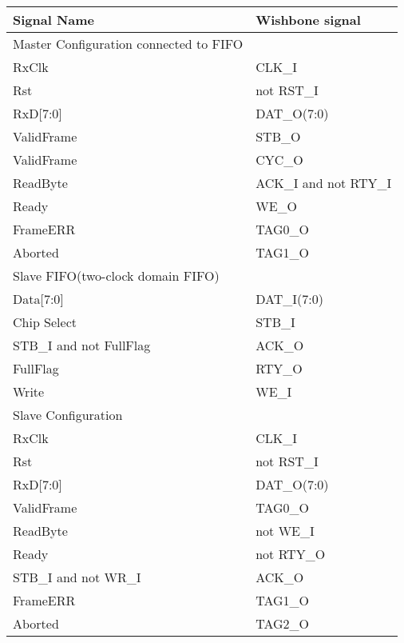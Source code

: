 \documentclass[a4paper,11pt]{article}
\begin{document}
\begin{tabular}{|l|l|}
\hline
Signal Name& Wishbone signal\\
\hline
\hline
Master Configuration connected to FIFO&\\
\hline
RxClk & CLK\_I\\
Rst & not RST\_I\\
RxD[7:0]& DAT\_O(7:0)\\
ValidFrame& STB\_O\\
ValidFrame& CYC\_O\\
ReadByte& ACK\_I and not RTY\_I\\
Ready& WE\_O\\
FrameERR& TAG0\_O\\
Aborted& TAG1\_O\\
\hline
Slave FIFO(two-clock domain FIFO)&\\
\hline
Data[7:0]& DAT\_I(7:0)\\
Chip Select& STB\_I\\
STB\_I and not FullFlag& ACK\_O\\
FullFlag& RTY\_O\\
Write& WE\_I\\
\hline
Slave Configuration &\\
\hline
RxClk & CLK\_I\\
Rst & not RST\_I\\
RxD[7:0]& DAT\_O(7:0)\\
ValidFrame& TAG0\_O\\
ReadByte& not WE\_I\\
Ready& not RTY\_O\\
STB\_I and not WR\_I& ACK\_O\\
FrameERR& TAG1\_O\\
Aborted& TAG2\_O\\
\hline
\end{tabular}
\end{document}
